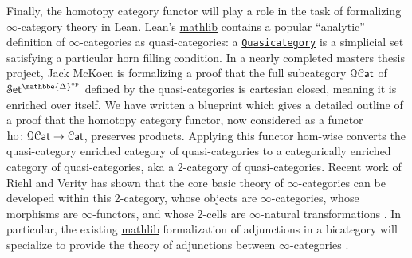 \documentclass[a4paper,UKenglish,cleveref, autoref, thm-restate]{lipics-v2021}
\newcommand{\op}{\textup{op}}
\newcommand{\ho}{\textup{ho}}
\newcommand{\cat}[1]{\textup{\textsf{#1}}}%
\newcommand{\1}{\mathbbe{1}}
\newcommand{\2}{\mathbbe{2}}
\newcommand{\3}{\mathbbe{3}}
\newcommand{\DDelta}{\mathbbe{\Delta}}
\newcommand{\Cat}{\mathcal{C}\cat{at}}
\newcommand{\Set}{\mathcal{S}\cat{et}}
\newcommand{\QCat}{\mathcal{QC}\cat{at}}
\newcommand{\libmathlib}{\href{https://github.com/leanprover-community/mathlib}{\textsf{mathlib}}}
\newcommand{\ldoc}[2][]{\href{https://leanprover-community.github.io/mathlib4_docs/find/?pattern=#1#2\#doc}{\texttt{#2}}}
\begin{document}
Finally, the homotopy category functor will play a role in the task of formalizing $\infty$-category theory in Lean. Lean's \libmathlib{} contains a popular ``analytic'' definition of $\infty$-categories as quasi-categories: a \ldoc[SSet.]{Quasicategory} is a simplicial set satisfying a particular horn filling condition. In a nearly completed masters thesis project, Jack McKoen is formalizing a proof that the full subcategory $\QCat$ of $\Set^{\DDelta^\op}$ defined by the quasi-categories is cartesian closed, meaning it is enriched over itself. We have written a blueprint which gives a detailed outline of a proof that the homotopy category functor, now considered as a functor $\ho \colon \QCat \to \Cat$, preserves products. Applying this functor hom-wise converts the quasi-category enriched category of quasi-categories to a categorically enriched category of quasi-categories, aka a 2-category of quasi-categories. Recent work of Riehl and Verity has shown that the core basic theory of $\infty$-categories can be developed within this 2-category, whose objects are $\infty$-categories, whose morphisms are $\infty$-functors, and whose 2-cells are $\infty$-natural transformations \cite{RiehlVerity:2022eo}. In particular, the existing \libmathlib{} formalization of adjunctions in a bicategory will specialize to provide the theory of adjunctions between $\infty$-categories \cite{InfinityCosmos}.






\end{document}
